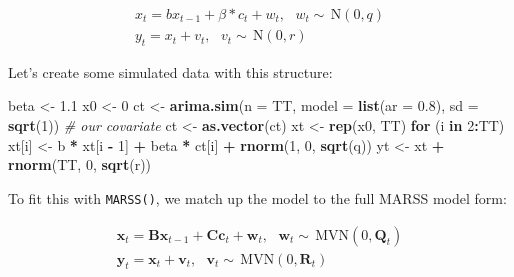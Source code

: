 \documentclass[12pt,]{book}
\newenvironment{Shaded}{\begin{snugshade}}{\end{snugshade}}
\newcommand{\CommentTok}[1]{\textcolor[rgb]{0.56,0.35,0.01}{\textit{#1}}}
\newcommand{\ControlFlowTok}[1]{\textcolor[rgb]{0.13,0.29,0.53}{\textbf{#1}}}
\newcommand{\DataTypeTok}[1]{\textcolor[rgb]{0.13,0.29,0.53}{#1}}
\newcommand{\DecValTok}[1]{\textcolor[rgb]{0.00,0.00,0.81}{#1}}
\newcommand{\FloatTok}[1]{\textcolor[rgb]{0.00,0.00,0.81}{#1}}
\newcommand{\KeywordTok}[1]{\textcolor[rgb]{0.13,0.29,0.53}{\textbf{#1}}}
\newcommand{\NormalTok}[1]{#1}
\newcommand{\OperatorTok}[1]{\textcolor[rgb]{0.81,0.36,0.00}{\textbf{#1}}}
\newcommand{\StringTok}[1]{\textcolor[rgb]{0.31,0.60,0.02}{#1}}
\begin{document}
\begin{equation}
\begin{gathered}
x_{t} = bx_{t-1} + \beta*c_t + w_{t}, \text{ } w_t \sim \,\text{N}(0,q)  \\
y_{t} = x_{t} + v_t, \text{ } v_t \sim \,\text{N}(0,r)  
\end{gathered}
\label{eq:short-lr-ar1-c}
\end{equation}

Let's create some simulated data with this structure:

\begin{Shaded}
\begin{Highlighting}[]
\NormalTok{beta <-}\StringTok{ }\FloatTok{1.1}
\NormalTok{x0 <-}\StringTok{ }\DecValTok{0}
\NormalTok{ct <-}\StringTok{ }\KeywordTok{arima.sim}\NormalTok{(}\DataTypeTok{n =}\NormalTok{ TT, }\DataTypeTok{model =} \KeywordTok{list}\NormalTok{(}\DataTypeTok{ar =} \FloatTok{0.8}\NormalTok{), }\DataTypeTok{sd =} \KeywordTok{sqrt}\NormalTok{(}\DecValTok{1}\NormalTok{))  }\CommentTok{# our covariate}
\NormalTok{ct <-}\StringTok{ }\KeywordTok{as.vector}\NormalTok{(ct)}
\NormalTok{xt <-}\StringTok{ }\KeywordTok{rep}\NormalTok{(x0, TT)}
\ControlFlowTok{for}\NormalTok{ (i }\ControlFlowTok{in} \DecValTok{2}\OperatorTok{:}\NormalTok{TT) xt[i] <-}\StringTok{ }\NormalTok{b }\OperatorTok{*}\StringTok{ }\NormalTok{xt[i }\OperatorTok{-}\StringTok{ }\DecValTok{1}\NormalTok{] }\OperatorTok{+}\StringTok{ }\NormalTok{beta }\OperatorTok{*}\StringTok{ }\NormalTok{ct[i] }\OperatorTok{+}\StringTok{ }\KeywordTok{rnorm}\NormalTok{(}\DecValTok{1}\NormalTok{, }
    \DecValTok{0}\NormalTok{, }\KeywordTok{sqrt}\NormalTok{(q))}
\NormalTok{yt <-}\StringTok{ }\NormalTok{xt }\OperatorTok{+}\StringTok{ }\KeywordTok{rnorm}\NormalTok{(TT, }\DecValTok{0}\NormalTok{, }\KeywordTok{sqrt}\NormalTok{(r))}
\end{Highlighting}
\end{Shaded}

To fit this with \texttt{MARSS()}, we match up the model to the full MARSS model form:

\begin{equation}
\begin{gathered}
\mathbf{x}_t = \mathbf{B}\mathbf{x}_{t-1} + \mathbf{C}\mathbf{c}_t + \mathbf{w}_t, \text{ } \mathbf{w}_t \sim \,\text{MVN}(0,\mathbf{Q}_t)\\
\mathbf{y}_t = \mathbf{x}_t + \mathbf{v}_t, \text{ } \mathbf{v}_t \sim \,\text{MVN}(0,\mathbf{R}_t)
\end{gathered}
\end{equation}
\end{document}
